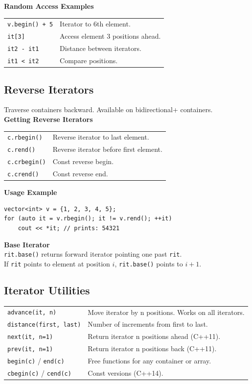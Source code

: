 \textbf{Random Access Examples}\\
\begin{tabularx}{\linewidth}{lX}
\texttt{v.begin() + 5} & Iterator to 6th element.\\
\texttt{it[3]} & Access element 3 positions ahead.\\
\texttt{it2 - it1} & Distance between iterators.\\
\texttt{it1 < it2} & Compare positions.\\
\end{tabularx}

\subsection{Reverse Iterators}

Traverse containers backward. Available on bidirectional+ containers.\\

\textbf{Getting Reverse Iterators}\\
\begin{tabularx}{\linewidth}{lX}
\texttt{c.rbegin()} & Reverse iterator to last element.\\
\texttt{c.rend()} & Reverse iterator before first element.\\
\texttt{c.crbegin()} & Const reverse begin.\\
\texttt{c.crend()} & Const reverse end.\\
\end{tabularx}

\textbf{Usage Example}\\
\begin{verbatim}
vector<int> v = {1, 2, 3, 4, 5};
for (auto it = v.rbegin(); it != v.rend(); ++it)
    cout << *it; // prints: 54321
\end{verbatim}

\textbf{Base Iterator}\\
\texttt{rit.base()} returns forward iterator pointing one past \texttt{rit}.\\
If \texttt{rit} points to element at position $i$, \texttt{rit.base()} points to $i+1$.

\subsection{Iterator Utilities}

\begin{tabularx}{\linewidth}{lX}
\texttt{advance(it, n)} & Move iterator by n positions. Works on all iterators.\\
\texttt{distance(first, last)} & Number of increments from first to last.\\
\texttt{next(it, n=1)} & Return iterator n positions ahead (C++11).\\
\texttt{prev(it, n=1)} & Return iterator n positions back (C++11).\\
\texttt{begin(c)} / \texttt{end(c)} & Free functions for any container or array.\\
\texttt{cbegin(c)} / \texttt{cend(c)} & Const versions (C++14).\\
\end{tabularx}

